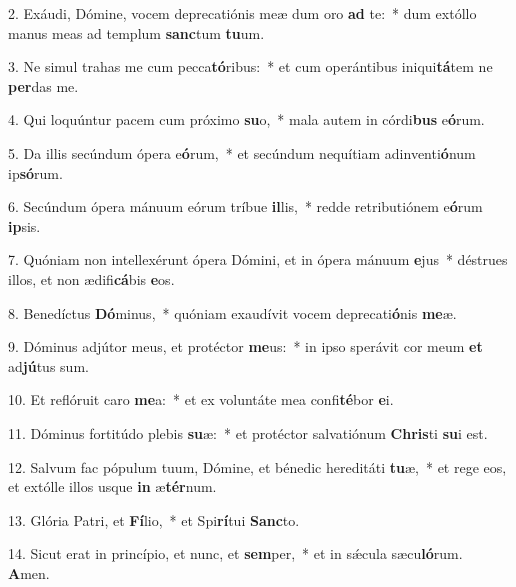 2. Exáudi, Dómine, vocem deprecatiónis meæ dum oro \textbf{ad} te:~*  dum extóllo manus meas ad templum \textbf{sanc}tum \textbf{tu}um.\

3. Ne simul trahas me cum pecca\textbf{tó}ribus:~*  et cum operántibus iniqui\textbf{tá}tem ne \textbf{per}das me.\

4. Qui loquúntur pacem cum próximo \textbf{su}o,~*  mala autem in córdi\textbf{bus} e\textbf{ó}rum.\

5. Da illis secúndum ópera e\textbf{ó}rum,~*  et secúndum nequítiam adinventi\textbf{ó}num ip\textbf{só}rum.\

6. Secúndum ópera mánuum eórum tríbue \textbf{il}lis,~*  redde retributiónem e\textbf{ó}rum \textbf{ip}sis.\

7. Quóniam non intellexérunt ópera Dómini, et in ópera mánuum \textbf{e}jus~*  déstrues illos, et non ædifi\textbf{cá}bis \textbf{e}os.\

8. Benedíctus \textbf{Dó}minus,~*  quóniam exaudívit vocem deprecati\textbf{ó}nis \textbf{me}æ.\

9. Dóminus adjútor meus, et protéctor \textbf{me}us:~*  in ipso sperávit cor meum \textbf{et} ad\textbf{jú}tus sum.\

10. Et reflóruit caro \textbf{me}a:~*  et ex voluntáte mea confi\textbf{té}bor \textbf{e}i.\

11. Dóminus fortitúdo plebis \textbf{su}æ:~*  et protéctor salvatiónum \textbf{Chris}ti \textbf{su}i est.\

12. Salvum fac pópulum tuum, Dómine, et bénedic hereditáti \textbf{tu}æ,~*  et rege eos, et extólle illos usque \textbf{in} æ\textbf{tér}num.\

13. Glória Patri, et \textbf{Fí}lio,~*  et Spi\textbf{rí}tui \textbf{Sanc}to.\

14. Sicut erat in princípio, et nunc, et \textbf{sem}per,~*  et in sǽcula sæcu\textbf{ló}rum. \textbf{A}men.\

